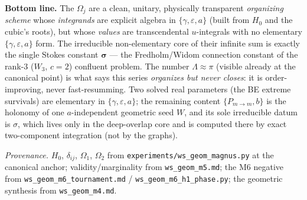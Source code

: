 \documentclass[11pt]{article}
\newcommand{\eps}{\varepsilon}
\newcommand{\Pmid}{P_{m\to m}}
\begin{document}
\noindent\textbf{Bottom line.} The $\Omega_j$ are a clean, unitary, physically transparent \emph{organizing
scheme} whose \emph{integrands} are explicit algebra in $\{\gamma,\eps,a\}$ (built from $H_0$ and the cubic's
roots), but whose \emph{values} are transcendental $u$-integrals with no elementary $\{\gamma,\eps,a\}$ form.
The irreducible non-elementary core of their infinite sum is exactly the single Stokes constant
$\boldsymbol{\sigma}$ --- the Fredholm/Widom connection constant of the rank-3 ($W_3$, $c{=}2$) confluent
problem. The number $\Lambda\approx\pi$ (visible already at the canonical point) is what says this series
\emph{organizes but never closes}: it is order-improving, never fast-resumming. Two solved real parameters
(the BE extreme survivals) are elementary in $\{\gamma,\eps,a\}$; the remaining content $\{\Pmid,b\}$ is the
holonomy of one $a$-independent geometric seed $W$, and its sole irreducible datum is $\sigma$, which lives
only in the deep-overlap core and is computed there by exact two-component integration (not by the graphs).

\medskip
\noindent\footnotesize\emph{Provenance.} $H_0$, $\delta_{ij}$, $\Omega_1$, $\Omega_2$ from
\texttt{experiments/ws\_geom\_magnus.py} at the canonical anchor; validity/marginality from
\texttt{ws\_geom\_m5.md}; the M6 negative from \texttt{ws\_geom\_m6\_tournament.md} /
\texttt{ws\_geom\_m6\_h1\_phase.py}; the geometric synthesis from \texttt{ws\_geom\_m4.md}.
\end{document}
